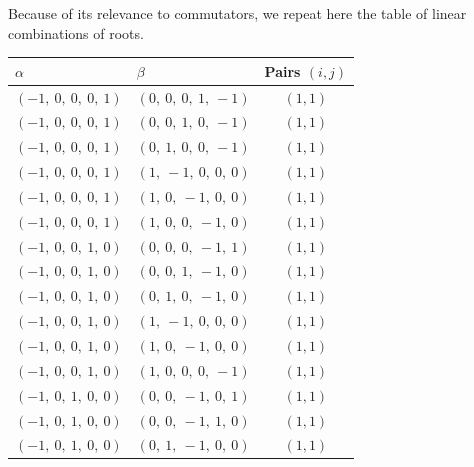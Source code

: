 \documentclass[11pt]{article}
\newcommand{\noi}{\noindent}
\theoremstyle{definition}
\begin{document}
\noi Because of its relevance to commutators, we repeat here the table of linear combinations of roots.

\begin{tabular}{|l|l|c|}
    \hline
    $\alpha$ & $\beta$ & Pairs $(i,j)$ \\
    \hline
    $\left( -1, \  0, \  0, \  0, \  1\right)$ & $\left( 0, \  0, \  0, \  1, \  -1\right)$ & $(1,1)$ \\
    \hline
    $\left( -1, \  0, \  0, \  0, \  1\right)$ & $\left( 0, \  0, \  1, \  0, \  -1\right)$ & $(1,1)$ \\
    \hline
    $\left( -1, \  0, \  0, \  0, \  1\right)$ & $\left( 0, \  1, \  0, \  0, \  -1\right)$ & $(1,1)$ \\
    \hline
    $\left( -1, \  0, \  0, \  0, \  1\right)$ & $\left( 1, \  -1, \  0, \  0, \  0\right)$ & $(1,1)$ \\
    \hline
    $\left( -1, \  0, \  0, \  0, \  1\right)$ & $\left( 1, \  0, \  -1, \  0, \  0\right)$ & $(1,1)$ \\
    \hline
    $\left( -1, \  0, \  0, \  0, \  1\right)$ & $\left( 1, \  0, \  0, \  -1, \  0\right)$ & $(1,1)$ \\
    \hline
    $\left( -1, \  0, \  0, \  1, \  0\right)$ & $\left( 0, \  0, \  0, \  -1, \  1\right)$ & $(1,1)$ \\
    \hline
    $\left( -1, \  0, \  0, \  1, \  0\right)$ & $\left( 0, \  0, \  1, \  -1, \  0\right)$ & $(1,1)$ \\
    \hline
    $\left( -1, \  0, \  0, \  1, \  0\right)$ & $\left( 0, \  1, \  0, \  -1, \  0\right)$ & $(1,1)$ \\
    \hline
    $\left( -1, \  0, \  0, \  1, \  0\right)$ & $\left( 1, \  -1, \  0, \  0, \  0\right)$ & $(1,1)$ \\
    \hline
    $\left( -1, \  0, \  0, \  1, \  0\right)$ & $\left( 1, \  0, \  -1, \  0, \  0\right)$ & $(1,1)$ \\
    \hline
    $\left( -1, \  0, \  0, \  1, \  0\right)$ & $\left( 1, \  0, \  0, \  0, \  -1\right)$ & $(1,1)$ \\
    \hline
    $\left( -1, \  0, \  1, \  0, \  0\right)$ & $\left( 0, \  0, \  -1, \  0, \  1\right)$ & $(1,1)$ \\
    \hline
    $\left( -1, \  0, \  1, \  0, \  0\right)$ & $\left( 0, \  0, \  -1, \  1, \  0\right)$ & $(1,1)$ \\
    \hline
    $\left( -1, \  0, \  1, \  0, \  0\right)$ & $\left( 0, \  1, \  -1, \  0, \  0\right)$ & $(1,1)$ \\

\end{tabular}
\end{document}
